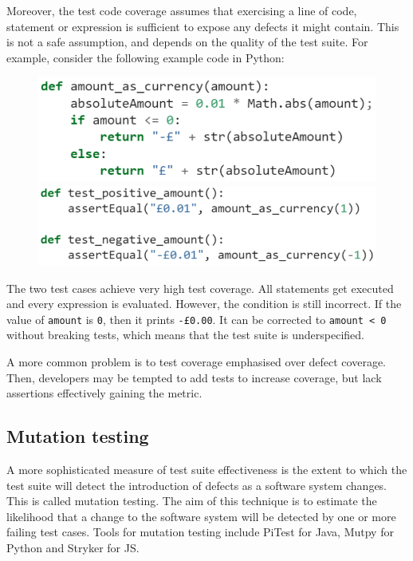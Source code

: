 \documentclass[a4paper, openany]{memoir}
\begin{document}
Moreover, the test code coverage assumes that exercising a line of code, statement or expression is sufficient to expose any defects it might contain. This is not a safe assumption, and depends on the quality of the test suite. For example, consider the following example code in Python:
\begin{figure}[H]
    \centering
    \includegraphics[scale=0.6]{src/12 Test coverage code.PNG}
    \includegraphics[scale=0.6]{src/12 Test coverage test.PNG}
\end{figure}
\noindent The two test cases achieve very high test coverage. All statements get executed and every expression is evaluated. However, the condition is still incorrect. If the value of \texttt{amount} is \texttt{0}, then it prints \texttt{-£0.00}. It can be corrected to \texttt{amount < 0} without breaking tests, which means that the test suite is underspecified.

A more common problem is to test coverage emphasised over defect coverage. Then, developers may be tempted to add tests to increase coverage, but lack assertions effectively gaining the metric.

\subsection{Mutation testing}
A more sophisticated measure of test suite effectiveness is the extent to which the test suite will detect the introduction of defects as a software system changes. This is called mutation testing. The aim of this technique is to estimate the likelihood that a change to the software system will be detected by one or more failing test cases. Tools for mutation testing include PiTest for Java, Mutpy for Python and Stryker for JS.
\end{document}
